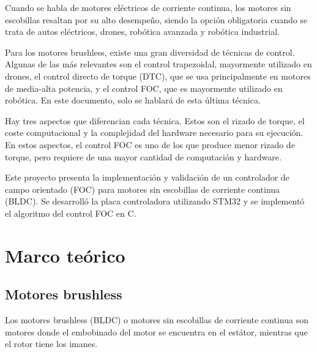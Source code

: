 \documentclass[11pt]{report}
\begin{document}
Cuando se habla de motores eléctricos de corriente continua, los motores sin escobillas resaltan por su alto desempeño, siendo la opción obligatoria cuando se trata de autos eléctricos, drones, robótica avanzada y robótica industrial.




Para los motores brushless, existe una gran diversidad de técnicas de control. Algunas de las más relevantes son el control trapezoidal, mayormente utilizado en drones, el control directo de torque (DTC), que se usa principalmente en motores de media-alta potencia, y el control FOC, que es mayormente utilizado en robótica. En este documento, solo se hablará de esta última técnica.

Hay tres aspectos que diferencian cada técnica. Estos son el rizado de torque, el coste computacional y la complejidad del hardware necesario para su ejecución. En estos aspectos, el control FOC es uno de los que produce menor rizado de torque, pero requiere de una mayor cantidad de computación y hardware.

Este proyecto presenta la implementación y validación de un controlador de campo orientado (FOC) para motores sin escobillas de corriente continua (BLDC). Se desarrolló la placa controladora utilizando STM32 y se implementó el algoritmo del control FOC en C.


\chapter*{Marco teórico}

\section{Motores brushless}
Los motores brushless (BLDC) o motores sin escobillas de corriente continua son motores donde el embobinado del motor se encuentra en el estátor, mientras que el rotor tiene los imanes.
\end{document}
